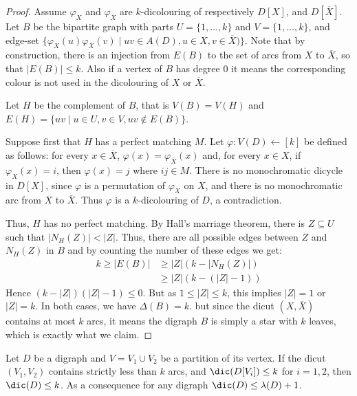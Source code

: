 \begin{proof}
Assume $\varphi_X$ and $\varphi_{\overline X}$ are  $k$-dicolouring of respectively $D[X]$, and $D[\overline X]$. 
    Let $B$ be the bipartite graph with parts $U = \{1,\dots,k\}$ and $V = \{1,\dots,k\}$, and edge-set $\{\varphi_{X}(u)\varphi_{\overline{X}}(v) \mid uv \in A(D), u \in X , v \in \overline{X})\}$.
    Note that by construction, there is an injection from $E(B)$ to the set of arcs from $X$ to $\overline X$, so that $|E(B)|\leq k$. Also if a vertex of $B$ has degree $0$ it means the corresponding colour is not used in the dicolouring of $X$ or $\overline X$.
      
     Let $H$ be the complement of $B$, that is $V(B) = V(H)$ and $E(H) = \{uv \mid u \in U, v \in V, uv \notin E(B)\}$. 
    
    Suppose first that $H$ has a perfect matching $M$.
     Let $\varphi:V(D) \leftarrow [k]$ be defined as follows:
    for every $x \in \overline{X}$, $\varphi(x)=\varphi_{\overline{X}}(x)$ and, for every $x \in X$, if $\varphi_{X}(x)=i$, then $\varphi(x)=j$ where $ij \in M$.  
    There is no monochromatic dicycle in $D[X]$, since $\varphi$ is a permutation of $\varphi_X$ on $X$, and there is no monochromatic arc from $X$ to $\overline{X}$. Thus $\varphi$ is a  $k$-dicolouring of $D$, a contradiction.
    
    
    Thus, $H$ has no perfect matching. By Hall's marriage theorem, there is $Z \subseteq U$ such that $|N_{H}(Z)| < |Z|$. Thus, there are all possible edges between $Z$ and $N_H(Z)$ in $B$ and by counting the number of these edges we get:
    \begin{align*}
        k \geq |E(B)| & \geq |Z| (k-|N_H(Z)|) \\
                            & \geq |Z|(k-(|Z|-1))
    \end{align*}
    Hence  $(k - |Z|)(|Z| - 1) \leq 0$. 
    But as $1 \leq |Z| \leq k$,  this implies $|Z| = 1$ or $|Z| = k$. In both cases, we have $\Delta(B) = k$. but since the dicut $(X,\overline X)$ contains at most $k$ arcs, it means the digraph $B$ is simply a star with $k$ leaves, which is exactly what we claim.
\end{proof}


\begin{corollary}\label{coro:small_cut}
Let $D$ be a digraph and $V=V_1\cup V_2$ be a partition of its vertex. If the dicut $(V_1,V_2)$ contains strictly less than $k$ arcs, and $\dic(D[V_i])\leq k$ for $i=1,2$, then $\dic(D)\leq k$. As a consequence for any digraph $\dic(D)\leq \lambda(D)+1$. 
\end{corollary}

